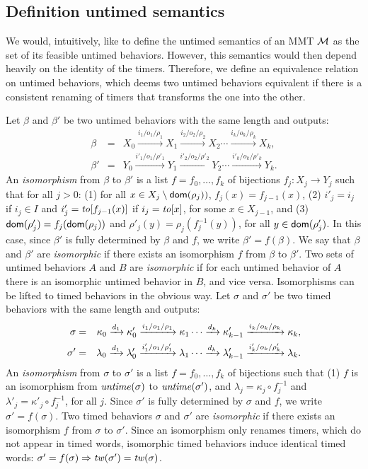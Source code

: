 \subsection{Definition untimed semantics}
We would, intuitively, like to define the untimed semantics of an MMT ${\mathcal M}$ as the set of its feasible untimed behaviors.
However, this semantics would then depend heavily on the identity of the timers. Therefore, we define an equivalence relation
on untimed behaviors, which deems two untimed behaviors equivalent if there is a consistent renaming of timers that transforms
the one into the other.

Let $\beta$ and $\beta'$ be two untimed behaviors with the same length and outputs:
\begin{eqnarray*}
\beta & = & X_0 \xrightarrow{i_1/o_1/\rho_1} X_1  \xrightarrow{i_2/o_2/\rho_2} X_2 \cdots \xrightarrow{i_k/o_k/\rho_k} X_{k},\\
\beta' & = & Y_0 \xrightarrow{i'_1/o_1/\rho'_1} Y_1  \xrightarrow{i'_2/o_2/\rho'_2} Y_2 \cdots \xrightarrow{i'_k/o_k/\rho'_k} Y_{k}.
\end{eqnarray*}
An \emph{isomorphism} from $\beta$ to $\beta'$ is a list $f = f_0 ,\ldots, f_k$ of bijections $f_j : X_j \rightarrow Y_j$ such that
for all $j>0$: (1) for all $x \in X_j \setminus {\textsf{dom}}(\rho_j))$, $f_j(x)=f_{j-1}(x)$,
(2) $i'_j = i_j$ if $i_j \in I$ and $i'_j = \mathit{to}[f_{j-1}(x)]$ if $i_j = \mathit{to}[x]$, for some $x \in X_{j-1}$, and
(3) ${\textsf{dom}}(\rho'_j) = f_j({\textsf{dom}}(\rho_j))$ and $\rho'_j(y) = \rho_j ( f_j^{-1}(y))$, for all $y\in{\textsf{dom}}(\rho'_j)$.
In this case, since $\beta'$ is fully determined by $\beta$ and $f$, we write $\beta' = f(\beta)$.
We say that $\beta$ and $\beta'$ are \emph{isomorphic} if there exists an isomorphism $f$ from $\beta$ to $\beta'$.
Two sets of untimed behaviors $A$ and $B$ are \emph{isomorphic} if for each untimed behavior of $A$ there is an isomorphic untimed behavior in $B$,
and vice versa.
Isomorphisms can be lifted to timed behaviors in the obvious way. 
\iflong
Let $\sigma$ and $\sigma'$ be two timed behaviors with the same length and outputs:
\begin{eqnarray*}
\sigma & = & \kappa_0 \xrightarrow{d_1} \kappa'_0 \xrightarrow{i_1/o_1/\rho_1} \kappa_1  \cdots
\xrightarrow{d_k} \kappa'_{k-1} \xrightarrow{i_k/o_k/\rho_k} \kappa_{k},\\
\sigma' & = & \lambda_0 \xrightarrow{d_1} \lambda'_0 \xrightarrow{i'_1/o_1/\rho'_1} \lambda_1  \cdots
\xrightarrow{d_k} \lambda'_{k-1} \xrightarrow{i'_k/o_k/\rho'_k} \lambda_{k}.
\end{eqnarray*}
An \emph{isomorphism} from $\sigma$ to $\sigma'$ is a list $f = f_0 ,\ldots, f_k$ of bijections such that
(1) $f$ is an isomorphism from $\mathit{untime}(\sigma)$ to $\mathit{untime}(\sigma')$, and
$\lambda_j = \kappa_j \circ f_j^{-1}$ and $\lambda'_j = \kappa'_j \circ f_j^{-1}$, for all $j$.
Since $\sigma'$ is fully determined by $\sigma$ and $f$, we write $\sigma' = f(\sigma)$.
Two timed behaviors $\sigma$ and $\sigma'$ are \emph{isomorphic} if there exists an isomorphism $f$ from $\sigma$ to $\sigma'$.
Since an isomorphism only renames timers, which do not appear in timed words, 
isomorphic timed behaviors induce identical timed words: $\sigma' = f(\sigma) \Rightarrow \mathit{tw}(\sigma') = \mathit{tw}(\sigma)$.

